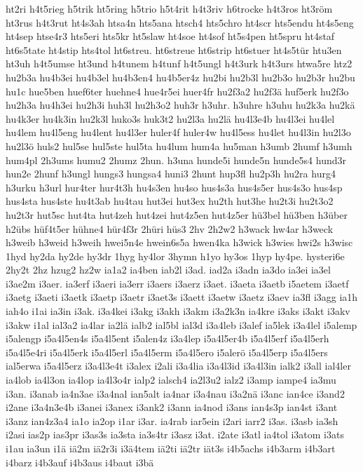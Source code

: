 {ht2ri
h4t5rieg
h5trik
ht5ring
h5trio
h5t4rit
h4t3riv
h6trocke
h4t3ros
ht3röm
ht3rus
h4t3rut
ht4s3ah
htsa4n
hts5ana
htsch4
hts5chro
ht4scr
hts5endu
ht4s5eng
ht4sep
htse4r3
hts5eri
hts5kr
ht5slaw
ht4soe
ht4sof
ht5s4pen
ht5spru
ht4staf
ht6s5tate
ht4stip
hts4tol
ht6streu.
ht6streue
ht6strip
ht6stuer
ht4s5tür
htu3en
ht3uh
h4t5umse
ht3und
h4tunem
h4tunf
h4t5ungl
h4t3urk
h4t3urs
htwa5re
htz2
hu2b3a
hu4b3ei
hu4b3el
hu4b3en4
hu4b5er4z
hu2bi
hu2b3l
hu2b3o
hu2b3r
hu2bu
hu1c
hue5ben
huef6ter
huehne4
hue4r5ei
huer4fr
hu2f3a2
hu2f3ä
huf5erk
hu2f3o
hu2h3a
hu4h3ei
hu2h3i
huh3l
hu2h3o2
huh3r
h3uhr.
h3uhre
h3uhu
hu2k3a
hu2kä
hu4k3er
hu4k3in
hu2k3l
huko3s
huk3t2
hu2l3a
hu2lä
hu4l3e4b
hu4l3ei
hu4lel
hu4lem
hu4l5eng
hu4lent
hu4l3er
huler4f
huler4w
hu4l5ess
hu4let
hu4l3in
hu2l3o
hu2l3ö
huls2
hul5se
hul5ste
hul5ta
hu4lum
hum4a
hu5man
h3umb
2humf
h3umh
hum4pl
2h3ums
humu2
2humz
2hun.
h3una
hunde5i
hunde5n
hunde5s4
hund3r
hun2e
2hunf
h3ungl
hungs3
hungsa4
huni3
2hunt
hup3fl
hu2p3h
hu2ra
hurg4
h3urku
h3url
hur4ter
hur4t3h
hu4s3en
hu4so
hus4s3a
hus4s5er
hus4s3o
hus4sp
hus4sta
hus4ste
hu4t3ab
hu4tau
hut3ei
hut3ex
hu2th
hut3he
hu2t3i
hu2t3o2
hu2t3r
hut5sc
hut4ta
hut4zeh
hut4zei
hut4z5en
hut4z5er
hü3bel
hü3ben
h3über
h2übs
hüf4t5er
hühne4
hür4f3r
2hüri
hüs3
2hv
2h2w2
h3wack
hw4ar
h3weck
h3weib
h3weid
h3weih
hwei5n4e
hwein6s5a
hwen4ka
h3wick
h3wies
hwi2s
h3wisc
1hyd
hy2da
hy2de
hy3dr
1hyg
hy4lor
3hymn
h1yo
hy3os
1hyp
hy4pe.
hysteri6e
2hy2t
2hz
hzug2
hz2w
ia1a2
ia4ben
iab2l
i3ad.
iad2a
i3adn
ia3do
ia3ei
ia3el
i3ae2m
i3aer.
ia3erf
i3aeri
ia3err
i3aers
i3aerz
i3aet.
i3aeta
i3aetb
i5aetem
i3aetf
i3aetg
i3aeti
i3aetk
i3aetp
i3aetr
i3aet3s
i3aett
i3aetw
i3aetz
i3aev
ia3fl
i3agg
ia1h
iah4o
i1ai
ia3in
i3ak.
i3a4kei
i3akg
i3akh
i3akm
i3a2k3n
ia4kre
i3aks
i3akt
i3akv
i3akw
i1al
ial3a2
ia4lar
ia2lä
ialb2
ial5bl
ial3d
i3a4leb
i3alef
ia5lek
i3a4lel
i5alemp
i5alengp
i5a4l5en4s
i5a4l5ent
i5alen4z
i3a4lep
i5a4l5er4b
i5a4l5erf
i5a4l5erh
i5a4l5e4ri
i5a4l5erk
i5a4l5erl
i5a4l5erm
i5a4l5ero
i5alerö
i5a4l5erp
i5a4l5ers
ial5erwa
i5a4l5erz
i3a4l3e4t
i3alex
i2ali
i3a4lia
i3a4l3id
i3a4l3in
ialk2
i3all
ial4ler
ia4lob
ia4l3on
ia4lop
ia4l3o4r
ialp2
ialsch4
ia2l3u2
ialz2
i3amp
iampe4
ia3mu
i3an.
i3anab
ia4n3ae
i3a4nal
ian5alt
ia4nar
i3a4nau
i3a2nä
i3anc
ian4ce
i3and2
i2ane
i3a4n3e4b
i3anei
i3anex
i3ank2
i3ann
ia4nod
i3ans
ian4s3p
ian4st
i3ant
i3anz
ian4z3a4
ia1o
ia2op
i1ar
i3ar.
ia4rab
iar5ein
i2ari
iarr2
i3as.
i3asb
ia3sh
i2asi
ias2p
ias3pr
i3as3s
ia3sta
ia3s4tr
i3asz
i3at.
i2ate
i3atl
ia4tol
i3atom
i3ats
i1au
ia3un
i1ä
iä2m
iä2r3i
i3ä4tem
iä2ti
iä2tr
iät3s
i4b5achs
i4b3arm
i4b3art
i4barz
i4b3auf
i4b3aus
i4baut
i3bä
}
